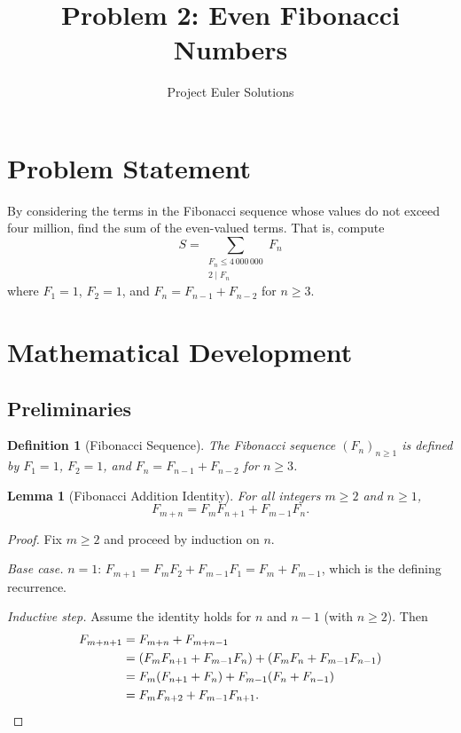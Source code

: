 \documentclass[11pt]{article}
\title{Problem 2: Even Fibonacci Numbers}
\author{Project Euler Solutions}
\date{}
\newtheorem{lemma}[theorem]{Lemma}
\newtheorem{definition}[theorem]{Definition}
\begin{document}
\maketitle

\section{Problem Statement}

By considering the terms in the Fibonacci sequence whose values do not exceed four million, find the sum of the even-valued terms. That is, compute
\[
S = \sum_{\substack{F_n \le 4\,000\,000 \\ 2 \mid F_n}} F_n
\]
where $F_1 = 1$, $F_2 = 1$, and $F_n = F_{n-1} + F_{n-2}$ for $n \ge 3$.

\section{Mathematical Development}

\subsection{Preliminaries}

\begin{definition}[Fibonacci Sequence]
The Fibonacci sequence $(F_n)_{n \ge 1}$ is defined by $F_1 = 1$, $F_2 = 1$, and $F_n = F_{n-1} + F_{n-2}$ for $n \ge 3$.
\end{definition}

\begin{lemma}[Fibonacci Addition Identity]
\label{lem:add}
For all integers $m \ge 2$ and $n \ge 1$,
\[
F_{m+n} = F_m F_{n+1} + F_{m-1} F_n.
\]
\end{lemma}

\begin{proof}
Fix $m \ge 2$ and proceed by induction on $n$.

\emph{Base case.} $n = 1$: $F_{m+1} = F_m F_2 + F_{m-1} F_1 = F_m + F_{m-1}$, which is the defining recurrence.

\emph{Inductive step.} Assume the identity holds for $n$ and $n-1$ (with $n \ge 2$). Then
\begin{align*}
F_{m+n+1} &= F_{m+n} + F_{m+n-1} \\
           &= (F_m F_{n+1} + F_{m-1} F_n) + (F_m F_n + F_{m-1} F_{n-1}) \\
           &= F_m(F_{n+1} + F_n) + F_{m-1}(F_n + F_{n-1}) \\
           &= F_m F_{n+2} + F_{m-1} F_{n+1}. \qedhere
\end{align*}
\end{proof}
\end{document}
